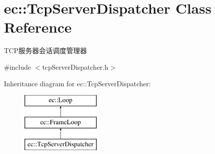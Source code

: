 \hypertarget{classec_1_1TcpServerDispatcher}{\section{ec\-:\-:Tcp\-Server\-Dispatcher Class Reference}
\label{classec_1_1TcpServerDispatcher}
}


T\-C\-P服务器会话调度管理器  




{\ttfamily \#include $<$tcp\-Server\-Dispatcher.\-h$>$}

Inheritance diagram for ec\-:\-:Tcp\-Server\-Dispatcher\-:\begin{figure}[H]
\begin{center}
\leavevmode
\includegraphics[height=3.000000cm]{classec_1_1TcpServerDispatcher}
\end{center}
\end{figure}
